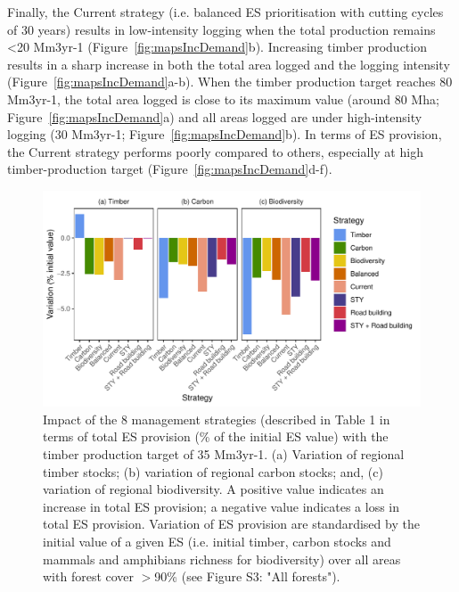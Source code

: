 \documentclass{article}
\begin{document}
Finally, the Current strategy (i.e. balanced ES prioritisation with cutting cycles of 30 years) results in low-intensity logging when the total production remains <20 Mm3yr-1 (Figure~\ref{fig:mapsIncDemand}b). Increasing timber production results in a sharp increase in both the total area logged and the logging intensity (Figure~\ref{fig:mapsIncDemand}a-b). When the timber production target reaches 80 Mm3yr-1, the total area logged is close to its maximum value (around 80 Mha; Figure~\ref{fig:mapsIncDemand}a) and all areas logged are under high-intensity logging (30 Mm3yr-1; Figure~\ref{fig:mapsIncDemand}b). In terms of ES provision, the Current strategy performs poorly compared to others, especially at high timber-production target (Figure~\ref{fig:mapsIncDemand}d-f).

\begin{figure}
    \centering
    \includegraphics[width=\linewidth]{graphs/costsScenario}
    \caption{Impact of the 8 management strategies (described in Table 1 in terms of total ES provision (\% of the initial ES value) with the timber production target of 35 Mm3yr-1. (a) Variation of regional timber stocks; (b) variation of regional carbon stocks; and, (c) variation of regional biodiversity. A positive value indicates an increase in total ES provision; a negative value indicates a loss in total ES provision. Variation of ES provision are standardised by the initial value of a given ES (i.e. initial timber, carbon stocks and mammals and amphibians richness for biodiversity) over all areas with forest cover $>$90\% (see Figure S3: "All forests"). 
 }
    \label{fig:scenESProv}
\end{figure}
\end{document}
